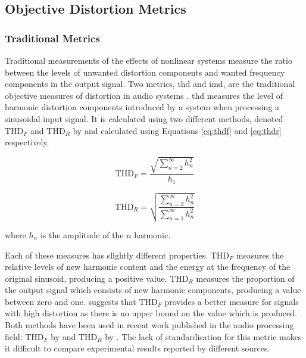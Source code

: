 	\subsection{Objective Distortion Metrics}
	\label{sec:Excitation-Analysis-Metrics}
		\subsubsection*{Traditional Metrics}
			Traditional measurements of the effects of nonlinear systems measure the ratio between the levels
			of unwanted distortion components and wanted frequency components in the output signal. Two
			metrics, \acrfull{thd} and \acrfull{imd}, are the traditional objective measures of distortion in
			audio systems \citep{czerwinski2001multitone1}. \acrshort{thd} measures the level of harmonic
			distortion components introduced by a system when processing a sinusoidal input signal. It is
			calculated using two different methods, denoted $\mathrm{THD}_{F}$ and $\mathrm{THD}_{R}$ by
			\citet{shmilovitz2005on} and calculated using Equations \ref{eq:thdf} and \ref{eq:thdr}
			respectively.

			\begin{equation}
				\mathrm{THD}_{F} = \frac{\sqrt{\sum_{n = 2}^{\infty} h_{n}^{2}}}{h_{1}}
				\label{eq:thdf}
			\end{equation}

			\begin{equation}
				\mathrm{THD}_{R} = \sqrt{\frac{\sum_{n = 2}^{\infty} h_{n}^{2}}
								       {\sum_{n = 1}^{\infty} h_{n}^{2}}}
				\label{eq:thdr}
			\end{equation}

			where $h_{n}$ is the amplitude of the $n$ harmonic. 

			Each of these measures has slightly different properties. $\mathrm{THD}_{F}$ measures the relative
			levels of new harmonic content and the energy at the frequency of the original sinusoid, producing
			a positive value. $\mathrm{THD}_{R}$ measures the proportion of the output signal which consists of
			new harmonic components, producing a value between zero and one. \citet{shmilovitz2005on} suggests
			that $\mathrm{THD}_{F}$ provides a better measure for signals with high distortion as there is no
			upper bound on the value which is produced.  Both methods have been used in recent work published
			in the audio processing field: $\mathrm{THD}_{F}$ by \citet{fleischmann2014a} and
			$\mathrm{THD}_{R}$ by \citet{dutilleux2011nonlinear}.  The lack of standardisation for this metric
			makes it difficult to compare experimental results reported by different sources.

